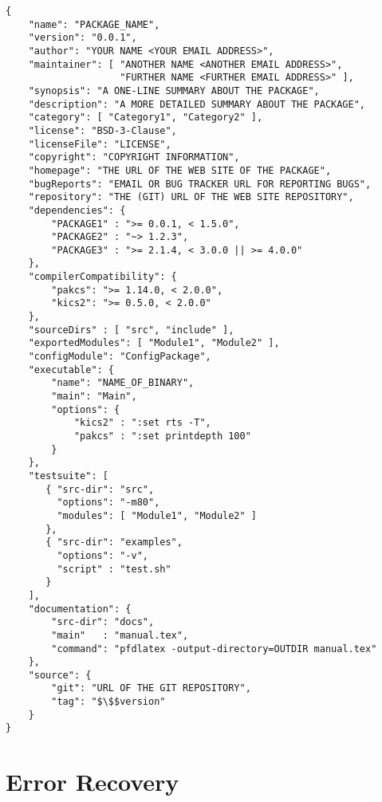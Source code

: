 \documentclass[11pt]{article}
\begin{document}
\begin{lstlisting}
{
    "name": "PACKAGE_NAME",
    "version": "0.0.1",
    "author": "YOUR NAME <YOUR EMAIL ADDRESS>",
    "maintainer": [ "ANOTHER NAME <ANOTHER EMAIL ADDRESS>",
                    "FURTHER NAME <FURTHER EMAIL ADDRESS>" ],
    "synopsis": "A ONE-LINE SUMMARY ABOUT THE PACKAGE",
    "description": "A MORE DETAILED SUMMARY ABOUT THE PACKAGE",
    "category": [ "Category1", "Category2" ],
    "license": "BSD-3-Clause",
    "licenseFile": "LICENSE",
    "copyright": "COPYRIGHT INFORMATION",
    "homepage": "THE URL OF THE WEB SITE OF THE PACKAGE",
    "bugReports": "EMAIL OR BUG TRACKER URL FOR REPORTING BUGS",
    "repository": "THE (GIT) URL OF THE WEB SITE REPOSITORY",
    "dependencies": {
        "PACKAGE1" : ">= 0.0.1, < 1.5.0",
        "PACKAGE2" : "~> 1.2.3",
        "PACKAGE3" : ">= 2.1.4, < 3.0.0 || >= 4.0.0"
    },
    "compilerCompatibility": {
        "pakcs": ">= 1.14.0, < 2.0.0",
        "kics2": ">= 0.5.0, < 2.0.0"
    },
    "sourceDirs" : [ "src", "include" ],
    "exportedModules": [ "Module1", "Module2" ],
    "configModule": "ConfigPackage",
    "executable": {
        "name": "NAME_OF_BINARY",
        "main": "Main",
        "options": {
            "kics2" : ":set rts -T",
            "pakcs" : ":set printdepth 100"
        }
    },
    "testsuite": [
       { "src-dir": "src",
         "options": "-m80",
         "modules": [ "Module1", "Module2" ]
       },
       { "src-dir": "examples",
         "options": "-v",
         "script" : "test.sh"
       }
    ],
    "documentation": {
        "src-dir": "docs",
        "main"   : "manual.tex",
        "command": "pfdlatex -output-directory=OUTDIR manual.tex"
    },
    "source": {
        "git": "URL OF THE GIT REPOSITORY",
        "tag": "$\$$version"
    }
}
\end{lstlisting}


\clearpage

\section{Error Recovery}
\label{sec:recovery}
\end{document}
